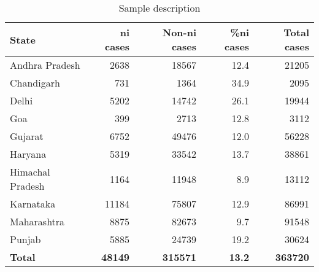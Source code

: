 \documentclass[12pt,a4paper]{article}
\begin{document}
		
		
		
		
		
		\begin{table}[!ht] 
			\caption{Sample description} \label{tab:sample_desc}
			\centering
			\footnotesize
			\begin{tabular}{lrrr|r}
				\toprule
				\textbf{State} & \textbf{\gls{ni} cases} & \textbf{Non-\gls{ni} cases} & \textbf{\%\gls{ni} cases} & \textbf{Total cases}\\ \midrule
				Andhra Pradesh & 2638 & 18567 & 12.4 & 21205\\
				Chandigarh & 731 & 1364 & 34.9 & 2095\\
				Delhi & 5202 & 14742 & 26.1 & 19944\\
				Goa & 399 & 2713 & 12.8 & 3112\\
				Gujarat & 6752 & 49476 & 12.0 & 56228\\
				Haryana & 5319 & 33542 & 13.7 & 38861\\
				Himachal Pradesh & 1164 & 11948 & 8.9 & 13112\\
				Karnataka & 11184 & 75807 & 12.9 & 86991\\
				Maharashtra & 8875 & 82673 & 9.7 & 91548\\
				Punjab & 5885 & 24739 & 19.2 & 30624\\
				\midrule
				\textbf{Total} & \textbf{48149} & \textbf{315571} & \textbf{13.2} & \textbf{363720}\\ \bottomrule
			\end{tabular}
		\end{table}
		
\end{document}
